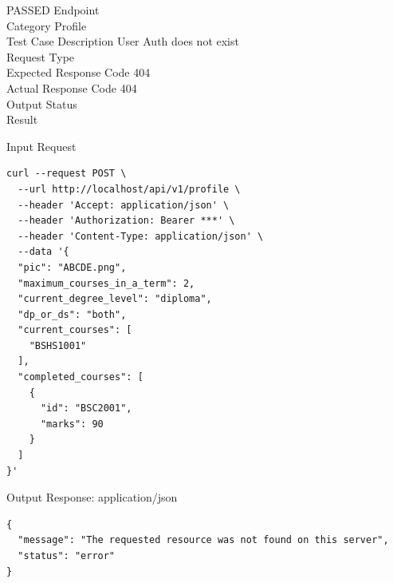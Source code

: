 \begin{testcase}{8}{PASSED}
Endpoint \hfill {}\\
Category \hfill Profile\\
Test Case Description \hfill User Auth does not exist\\

Request Type    \hfill {}\\
Expected Response Code    \hfill 404\\
Actual Response Code    \hfill 404\\

Output Status \hfill {}\\
Result \hfill {}

\begin{ipblock}{Input Request}
\begin{verbatim}
curl --request POST \
  --url http://localhost/api/v1/profile \
  --header 'Accept: application/json' \
  --header 'Authorization: Bearer ***' \
  --header 'Content-Type: application/json' \
  --data '{
  "pic": "ABCDE.png",
  "maximum_courses_in_a_term": 2,
  "current_degree_level": "diploma",
  "dp_or_ds": "both",
  "current_courses": [
    "BSHS1001"
  ],
  "completed_courses": [
    {
      "id": "BSC2001",
      "marks": 90
    }
  ]
}'
\end{verbatim}
\end{ipblock}

\begin{opblock}{Output Response: application/json}
\begin{verbatim}
{
  "message": "The requested resource was not found on this server",
  "status": "error"
}
\end{verbatim}
\end{opblock}
\end{testcase}

